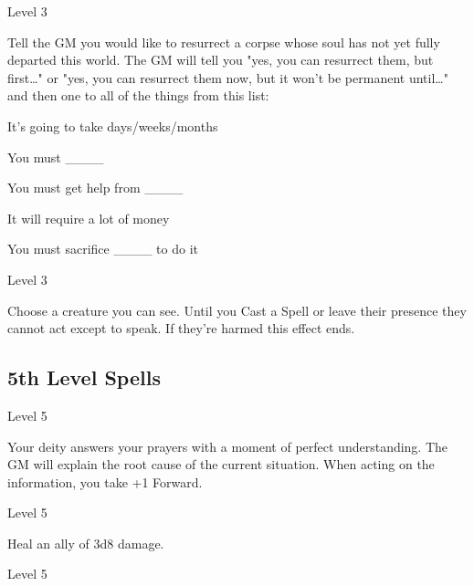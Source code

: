        
\startSpellName
          	Level 3
\stopSpellName
       

Tell the GM you would like to resurrect a corpse whose soul has not yet fully departed this world. The GM will tell you "yes, you can resurrect them, but first…" or "yes, you can resurrect them now, but it won't be permanent until…" and then one to all of the things from this list:

       
\startitemize[1,packed]
         
\item It's going to take days/weeks/months

         
\item You must \_\_\_\_

         
\item You must get help from \_\_\_\_

         
\item It will require a lot of money

         
\item You must sacrifice \_\_\_\_ to do it

       
\stopitemize
       
\startSpellName
          	Level 3
\stopSpellName
       

Choose a creature you can see. Until you Cast a Spell or leave their presence they cannot act except to speak. If they're harmed this effect ends.

     

     

       
\subsection{5th Level Spells}     
       
\startSpellName
          	Level 5
\stopSpellName
       

Your deity answers your prayers with a moment of perfect understanding. The GM will explain the root cause of the current situation. When acting on the information, you take +1 Forward.

       
\startSpellName
          	Level 5
\stopSpellName
       

Heal an ally of 3d8 damage.

       
\startSpellName
          	Level 5
\stopSpellName
       

